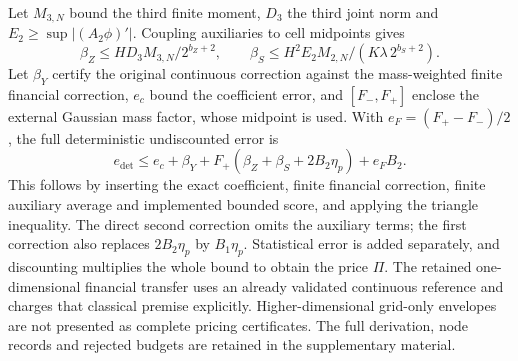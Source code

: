 Let $M_{3,N}$ bound the third finite moment, $D_3$ the third joint norm and
$E_2\geq\sup|(A_2\phi)'|$.  Coupling auxiliaries to cell midpoints gives
\[
 \beta_Z\leq HD_3M_{3,N}/2^{b_Z+2},\qquad
 \beta_S\leq H^2E_2M_{2,N}/(K\lambda\,2^{b_S+2}).
\]
Let $\beta_Y$ certify the original continuous correction against the
mass-weighted finite financial correction, $e_c$ bound the coefficient error,
and $[F_-,F_+]$ enclose the external Gaussian mass factor, whose midpoint is
used.  With $e_F=(F_+-F_-)/2$, the full deterministic undiscounted error is
\begin{equation}
 e_{\mathrm{det}}\leq e_c+\beta_Y+
 F_+(\beta_Z+\beta_S+2B_2\eta_p)+e_FB_2.
 \label{eq:core-monetary-certificate}
\end{equation}
This follows by inserting the exact coefficient, finite financial correction,
finite auxiliary average and implemented bounded score, and applying the
triangle inequality.  The direct second correction omits the auxiliary
terms; the first correction also replaces $2B_2\eta_p$ by $B_1\eta_p$.
Statistical error is added separately, and discounting multiplies the whole
bound to obtain the price $\Pi$.  The retained one-dimensional financial
transfer uses an already validated continuous reference and charges that
classical premise explicitly.  Higher-dimensional grid-only envelopes are
not presented as complete pricing certificates.  The full derivation, node
records and rejected budgets are retained in the supplementary material.
